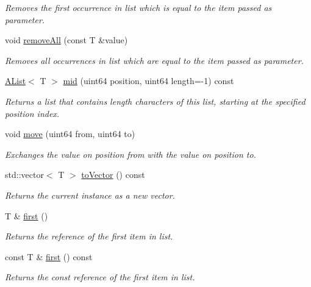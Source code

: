 \begin{DoxyCompactItemize}
\begin{DoxyCompactList}\small\item\em Removes the first occurrence in list which is equal to the item passed as parameter. \end{DoxyCompactList}\item 
void \mbox{\hyperlink{class_a_list_a32b8779cd05c79fe74f79c854b54a5f7}{remove\+All}} (const T \&value)
\begin{DoxyCompactList}\small\item\em Removes all occurrences in list which are equal to the item passed as parameter. \end{DoxyCompactList}\item 
\mbox{\hyperlink{class_a_list}{A\+List}}$<$ T $>$ \mbox{\hyperlink{class_a_list_a9ccaadf22f9f08197fee08bf6befcfdd}{mid}} (uint64 position, uint64 length=-\/1) const
\begin{DoxyCompactList}\small\item\em Returns a list that contains length characters of this list, starting at the specified position index. \end{DoxyCompactList}\item 
void \mbox{\hyperlink{class_a_list_af091a1d7ddb9a3b9becc827da8eded09}{move}} (uint64 from, uint64 to)
\begin{DoxyCompactList}\small\item\em Exchanges the value on position from with the value on position to. \end{DoxyCompactList}\item 
std\+::vector$<$ T $>$ \mbox{\hyperlink{class_a_list_a6e1a3cea40a3046c16643680e8581552}{to\+Vector}} () const
\begin{DoxyCompactList}\small\item\em Returns the current instance as a new vector. \end{DoxyCompactList}\item 
T \& \mbox{\hyperlink{class_a_list_aca24663d0fe32d878cd4a214ade18372}{first}} ()
\begin{DoxyCompactList}\small\item\em Returns the reference of the first item in list. \end{DoxyCompactList}\item 
const T \& \mbox{\hyperlink{class_a_list_a1cf9c09ee90e96a5f72a39344f8240be}{first}} () const
\begin{DoxyCompactList}\small\item\em Returns the const reference of the first item in list. \end{DoxyCompactList}\item 

\end{DoxyCompactItemize}
